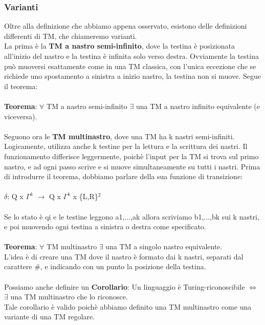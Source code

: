 \documentclass[]{article}
\begin{document}
			\subsubsection{Varianti}
				Oltre alla definizione che abbiamo appena osservato, esistono delle definizioni differenti di TM, che chiameremo varianti.\\
				La prima è la \textbf{TM a nastro semi-infinito}, dove la testina è posizionata all'inizio del nastro e la testina è infinita solo verso destra. Ovviamente la testina può muoversi esattamente come in una TM classica, con l'unica eccezione che se richiede uno spostamento a sinistra a inizio nastro, la testina non si muove. Segue il teorema:\\\\
				\textbf{Teorema}: $\forall$ TM a nastro semi-infinito $\exists$ una TM a nastro infinito equivalente (e viceversa).\\\\
				Seguono ora le \textbf{TM multinastro}, dove una TM ha k nastri semi-infiniti. Logicamente, utilizza anche k testine per la lettura e la scrittura dei nastri. Il funzionamento differisce leggermente, poichè l'input per la TM si trova sul primo nastro, e ad ogni passo scrive e si muove simultaneamente su tutti i nastri. Prima di introdurre il teorema, dobbiamo parlare della sua funzione di transizione:\\\\
				$\delta$: Q x $\Gamma^k$ $\rightarrow$ Q x $\Gamma^k$ x \{L,R\}$^2$\\\\
				Se lo stato è qi e le testine leggono a1,...,ak allora scriviamo b1,...,bk sui k nastri, e poi muovendo ogni testina a sinistra o destra come specificato.\\\\
				\textbf{Teorema}: $\forall$ TM multinastro $\exists$ una TM a singolo nastro equivalente.\\
				L'idea è di creare una TM dove il nastro è formato dai k nastri, separati dal carattere \#, e indicando con un punto la posizione della testina.\\\\
				Possiamo anche definire un \textbf{Corollario}: Un linguaggio è Turing-riconoscibile $\Leftrightarrow$ $\exists$ una TM multinastro che lo riconosce.\\
				Tale corollario è valido poichè abbiamo definito una TM multinastro come una variante di una TM regolare.\\\\
\end{document}
